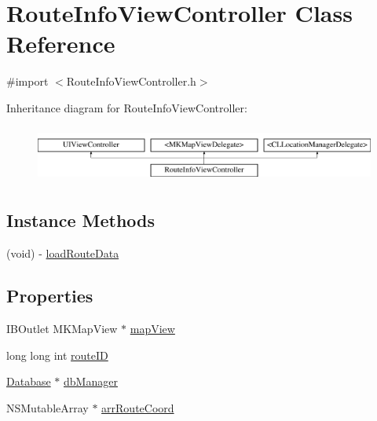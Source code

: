 \hypertarget{interfaceRouteInfoViewController}{\section{Route\-Info\-View\-Controller Class Reference}
\label{interfaceRouteInfoViewController}
}


{\ttfamily \#import $<$Route\-Info\-View\-Controller.\-h$>$}

Inheritance diagram for Route\-Info\-View\-Controller\-:\begin{figure}[H]
\begin{center}
\leavevmode
\includegraphics[height=1.876047cm]{interfaceRouteInfoViewController}
\end{center}
\end{figure}
\subsection*{Instance Methods}
\begin{DoxyCompactItemize}
\item 
(void) -\/ \hyperlink{interfaceRouteInfoViewController_a8bfec5ad745b6192124fc9dab10775a8}{load\-Route\-Data}
\end{DoxyCompactItemize}
\subsection*{Properties}
\begin{DoxyCompactItemize}
\item 
I\-B\-Outlet M\-K\-Map\-View $\ast$ \hyperlink{interfaceRouteInfoViewController_a05fec55f48777eed52aea7872128648b}{map\-View}
\item 
long long int \hyperlink{interfaceRouteInfoViewController_ada165232dfcc705567763b8b5ad234c1}{route\-I\-D}
\item 
\hyperlink{interfaceDatabase}{Database} $\ast$ \hyperlink{interfaceRouteInfoViewController_abca6639d927411ab6d56c47859f42d85}{db\-Manager}
\item 
N\-S\-Mutable\-Array $\ast$ \hyperlink{interfaceRouteInfoViewController_a4f2d1dc4014af950cfad38306ca87d0e}{arr\-Route\-Coord}
\end{DoxyCompactItemize}


